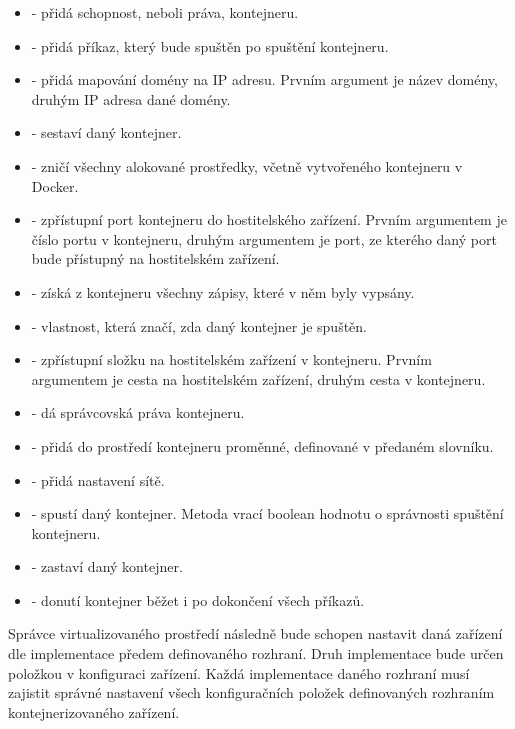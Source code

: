 \begin{itemize}
    \item {} - přidá schopnost, neboli práva, kontejneru.
    \item {} - přidá příkaz, který bude spuštěn po spuštění kontejneru.
    \item {} - přidá mapování domény na IP adresu. Prvním argument je název domény, druhým IP adresa dané domény. 
    \item {} - sestaví daný kontejner.
    \item {} - zničí všechny alokované prostředky, včetně vytvořeného kontejneru v Docker.
    \item {} - zpřístupní port kontejneru do hostitelského zařízení. Prvním argumentem je číslo portu v kontejneru, druhým argumentem je port, ze kterého daný port bude přístupný na hostitelském zařízení. 
    \item {} - získá z kontejneru všechny zápisy, které v něm byly vypsány.
    \item {} - vlastnost, která značí, zda daný kontejner je spuštěn.
    \item {} - zpřístupní složku na hostitelském zařízení v kontejneru. Prvním argumentem je cesta na hostitelském zařízení, druhým cesta v kontejneru.
    \item {} - dá správcovská práva kontejneru.
    \item {} - přidá do prostředí kontejneru proměnné, definované v předaném slovníku.
    \item {} - přidá nastavení sítě.
    \item {} - spustí daný kontejner. Metoda vrací boolean hodnotu o správnosti spuštění kontejneru.
    \item {} - zastaví daný kontejner.
    \item {} - donutí kontejner běžet i po dokončení všech příkazů.
\end{itemize}

Správce virtualizovaného prostředí následně bude schopen nastavit daná zařízení dle implementace předem definovaného rozhraní. Druh implementace bude určen položkou  v konfiguraci zařízení. Každá implementace daného rozhraní musí zajistit správné nastavení všech konfiguračních položek definovaných rozhraním kontejnerizovaného zařízení.

